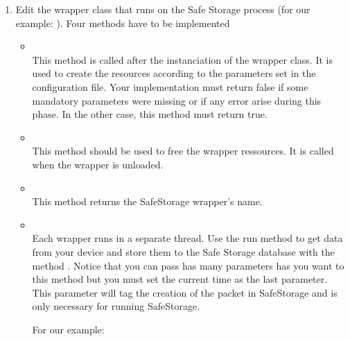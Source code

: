 \begin{enumerate}
	\item Edit the wrapper class that runs on the Safe Storage process (for our example: ).
	Four methods have to be implemented

	\begin{itemize}
		\item {} \\
		This method is called after the instanciation of the wrapper class.
		It is used to create the resources according to the parameters set in the configuration file. 
		Your implementation must return false if some mandatory parameters were missing or if any error
		arise during this phase. 
		In the other case, this method must return true.
		
		\item {} \\
		This method should be used to free the wrapper ressources. It is called when the wrapper is unloaded.

		\item {} \\
		This method returns the SafeStorage wrapper's name.

		\item {} \\
		Each wrapper runs in a separate thread. Use the run method to get data from your device and store them to
		the Safe Storage database with the method .
		Notice that you can pass has many parameters has you want to this method but you must set the current time as the last parameter. 
		This parameter will tag the creation of the packet in SafeStorage and is only necessary for running SafeStorage. %

		For our example: \\
	\end{itemize}


\end{enumerate}
